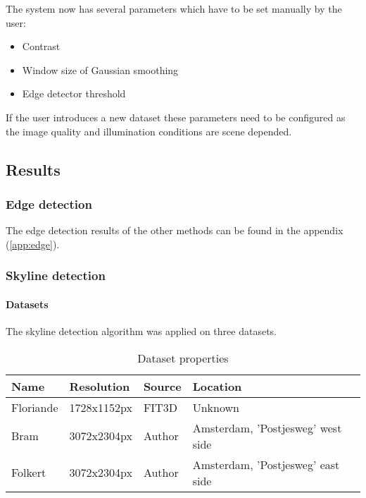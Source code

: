 The system now has several parameters which have to be set manually by the user:
\begin{itemize}
	\item Contrast
	\item Window size of Gaussian smoothing 
	\item Edge detector threshold
\end{itemize}

If the user introduces a new dataset these parameters need to be configured
as the image quality and illumination conditions are scene depended.


\subsection{Results}
\subsubsection{Edge detection}
\label{sec:ResultEdge}
The edge detection results of the other methods can be found in the appendix
(\ref{app:edge}).
\clearpage


\subsubsection{Skyline detection}
\paragraph{Datasets}
The skyline detection algorithm was applied on three datasets. 

\begin{table}[ht]
\caption{Dataset properties}
\begin{tabular}{|l||l|l|l|}
\hline
Name 	& Resolution 	& Source	& Location\\
\hline
\hline
Floriande & 1728x1152px  & FIT3D \cite{FIT3D}  	& Unknown\\
\hline
Bram	 & 3072x2304px  & Author					& Amsterdam, 'Postjesweg' west side\\
\hline
Folkert  & 3072x2304px  & Author					& Amsterdam, 'Postjesweg' east side\\
\hline
\end{tabular}
\end{table}


